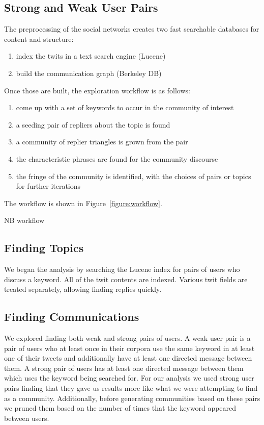 \subsection{Strong and Weak User Pairs}

The preprocessing of the social networks creates two fast searchable databases for content and structure:

\begin{enumerate}
	\item index the twits in a text search engine (Lucene)
	\item build the communication graph (Berkeley DB)
\end{enumerate}

Once those are built, the exploration workflow is as follows:

\begin{enumerate}
	\item come up with a set of keywords to occur in the community of interest
	\item a seeding pair of repliers about the topic is found
	\item a community of replier triangles is grown from the pair
	\item the characteristic phrases are found for the community discourse
	\item the fringe of the community is identified, with the choices of pairs or topics for further iterations
\end{enumerate}

The workflow is shown in Figure~\ref{figure:workflow}.

NB workflow
	
\subsection{Finding Topics}

We began the analysis by searching the Lucene index for pairs of users who discuss a keyword.  All of the twit contents are indexed.  Various twit fields are treated separately, allowing finding replies quickly.

\subsection{Finding Communications}

We explored finding both weak and strong pairs of users.  A weak user pair is a pair of users who at least once in their corpora use the same keyword in at least one of their tweets and additionally have at least one directed message between them.  A strong pair of users has at least one directed message between them which uses the keyword being searched for.  For our analysis we used strong user pairs finding that they gave us results more like what we were attempting to find as a community.  Additionally, before generating communities based on these pairs we pruned them based on the number of times that the keyword appeared between users.

